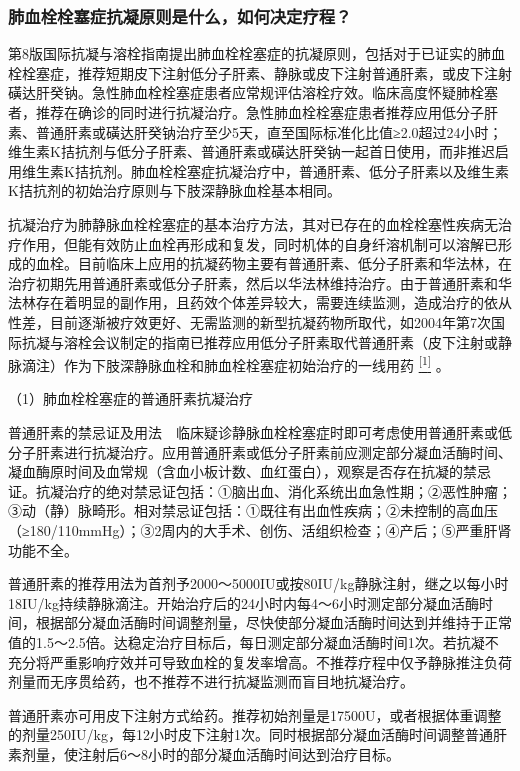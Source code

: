\subsubsection{肺血栓栓塞症抗凝原则是什么，如何决定疗程？}

第8版国际抗凝与溶栓指南提出肺血栓栓塞症的抗凝原则，包括对于已证实的肺血栓栓塞症，推荐短期皮下注射低分子肝素、静脉或皮下注射普通肝素，或皮下注射磺达肝癸钠。急性肺血栓栓塞症患者应常规评估溶栓疗效。临床高度怀疑肺栓塞者，推荐在确诊的同时进行抗凝治疗。急性肺血栓栓塞症患者推荐应用低分子肝素、普通肝素或磺达肝癸钠治疗至少5天，直至国际标准化比值≥2.0超过24小时；维生素K拮抗剂与低分子肝素、普通肝素或磺达肝癸钠一起首日使用，而非推迟启用维生素K拮抗剂。肺血栓栓塞症抗凝治疗中，普通肝素、低分子肝素以及维生素K拮抗剂的初始治疗原则与下肢深静脉血栓基本相同。

抗凝治疗为肺静脉血栓栓塞症的基本治疗方法，其对已存在的血栓栓塞性疾病无治疗作用，但能有效防止血栓再形成和复发，同时机体的自身纤溶机制可以溶解已形成的血栓。目前临床上应用的抗凝药物主要有普通肝素、低分子肝素和华法林，在治疗初期先用普通肝素或低分子肝素，然后以华法林维持治疗。由于普通肝素和华法林存在着明显的副作用，且药效个体差异较大，需要连续监测，造成治疗的依从性差，目前逐渐被疗效更好、无需监测的新型抗凝药物所取代，如2004年第7次国际抗凝与溶栓会议制定的指南已推荐应用低分子肝素取代普通肝素（皮下注射或静脉滴注）作为下肢深静脉血栓和肺血栓栓塞症初始治疗的一线用药
\protect\hyperlink{text00022.htmlux5cux23ch1-21}{\textsuperscript{{[}1{]}}}
。

（1）肺血栓栓塞症的普通肝素抗凝治疗

普通肝素的禁忌证及用法　临床疑诊静脉血栓栓塞症时即可考虑使用普通肝素或低分子肝素进行抗凝治疗。应用普通肝素或低分子肝素前应测定部分凝血活酶时间、凝血酶原时间及血常规（含血小板计数、血红蛋白），观察是否存在抗凝的禁忌证。抗凝治疗的绝对禁忌证包括：①脑出血、消化系统出血急性期；②恶性肿瘤；③动（静）脉畸形。相对禁忌证包括：①既往有出血性疾病；②未控制的高血压（≥180/110mmHg）；③2周内的大手术、创伤、活组织检查；④产后；⑤严重肝肾功能不全。

普通肝素的推荐用法为首剂予2000～5000IU或按80IU/kg静脉注射，继之以每小时18IU/kg持续静脉滴注。开始治疗后的24小时内每4～6小时测定部分凝血活酶时间，根据部分凝血活酶时间调整剂量，尽快使部分凝血活酶时间达到并维持于正常值的1.5～2.5倍。达稳定治疗目标后，每日测定部分凝血活酶时间1次。若抗凝不充分将严重影响疗效并可导致血栓的复发率增高。不推荐疗程中仅予静脉推注负荷剂量而无序贯给药，也不推荐不进行抗凝监测而盲目地抗凝治疗。

普通肝素亦可用皮下注射方式给药。推荐初始剂量是17500U，或者根据体重调整的剂量250IU/kg，每12小时皮下注射1次。同时根据部分凝血活酶时间调整普通肝素剂量，使注射后6～8小时的部分凝血活酶时间达到治疗目标。

